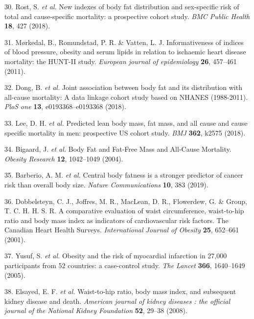 \documentclass[11pt,twoside]{bristolthesis}
\begin{document}
\leavevmode\hypertarget{ref-Rost2018}{}%
30. Rost, S. \emph{et al.} New indexes of body fat distribution and sex-specific risk of total and cause-specific mortality: a prospective cohort study. \emph{BMC Public Health} \textbf{18}, 427 (2018).

\leavevmode\hypertarget{ref-Muxf8rkedal2011}{}%
31. Mørkedal, B., Romundstad, P. R. \& Vatten, L. J. Informativeness of indices of blood pressure, obesity and serum lipids in relation to ischaemic heart disease mortality: the HUNT-II study. \emph{European journal of epidemiology} \textbf{26}, 457--461 (2011).

\leavevmode\hypertarget{ref-Dong2018}{}%
32. Dong, B. \emph{et al.} Joint association between body fat and its distribution with all-cause mortality: A data linkage cohort study based on NHANES (1988-2011). \emph{PloS one} \textbf{13}, e0193368--e0193368 (2018).

\leavevmode\hypertarget{ref-Lee2018}{}%
33. Lee, D. H. \emph{et al.} Predicted lean body mass, fat mass, and all cause and cause specific mortality in men: prospective US cohort study. \emph{BMJ} \textbf{362}, k2575 (2018).

\leavevmode\hypertarget{ref-Bigaard2004}{}%
34. Bigaard, J. \emph{et al.} Body Fat and Fat-Free Mass and All-Cause Mortality. \emph{Obesity Research} \textbf{12}, 1042--1049 (2004).

\leavevmode\hypertarget{ref-Barberio2019}{}%
35. Barberio, A. M. \emph{et al.} Central body fatness is a stronger predictor of cancer risk than overall body size. \emph{Nature Communications} \textbf{10}, 383 (2019).

\leavevmode\hypertarget{ref-Dobbelsteyn2001}{}%
36. Dobbelsteyn, C. J., Joffres, M. R., MacLean, D. R., Flowerdew, G. \& Group, T. C. H. H. S. R. A comparative evaluation of waist circumference, waist-to-hip ratio and body mass index as indicators of cardiovascular risk factors. The Canadian Heart Health Surveys. \emph{International Journal of Obesity} \textbf{25}, 652--661 (2001).

\leavevmode\hypertarget{ref-Yusuf2005}{}%
37. Yusuf, S. \emph{et al.} Obesity and the risk of myocardial infarction in 27,000 participants from 52 countries: a case-control study. \emph{The Lancet} \textbf{366}, 1640--1649 (2005).

\leavevmode\hypertarget{ref-Elsayed2008}{}%
38. Elsayed, E. F. \emph{et al.} Waist-to-hip ratio, body mass index, and subsequent kidney disease and death. \emph{American journal of kidney diseases : the official journal of the National Kidney Foundation} \textbf{52}, 29--38 (2008).
\end{document}

